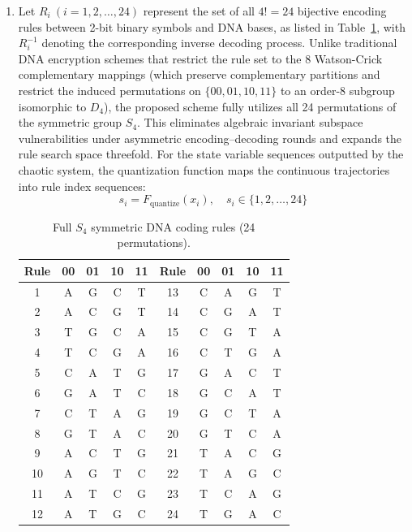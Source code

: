 \documentclass[a4paper,fleqn]{cas-dc}
\theoremstyle{plain}
\theoremstyle{definition}
\begin{document}
\begin{enumerate}
\item 
Let $R_i \ (i=1,2,\dots,24)$ represent the set of all $4! = 24$ bijective encoding rules between 2-bit binary symbols and DNA bases, as listed in Table~\ref{tab:dna_rules}, with $R_i^{-1}$ denoting the corresponding inverse decoding process. Unlike traditional DNA encryption schemes that restrict the rule set to the 8 Watson-Crick complementary mappings (which preserve complementary partitions and restrict the induced permutations on $\{00, 01, 10, 11\}$ to an order-8 subgroup isomorphic to $D_4$), the proposed scheme fully utilizes all 24 permutations of the symmetric group $S_4$. This eliminates algebraic invariant subspace vulnerabilities under asymmetric encoding--decoding rounds and expands the rule search space threefold. For the state variable sequences outputted by the chaotic system, the quantization function maps the continuous trajectories into rule index sequences:
\begin{equation}
	s_i = F_{\text{quantize}}(x_i), \quad s_i \in \{1, 2, \dots, 24\}
\end{equation}

\begin{table}[pos=!t,width=\textwidth]
		\centering
		\caption{Full $S_4$ symmetric DNA coding rules (24 permutations).}
		\label{tab:dna_rules}
		\begin{tabular}{c|cccc||c|cccc}
				\hline
				Rule & 00 & 01 & 10 & 11 & Rule & 00 & 01 & 10 & 11 \\
				\hline
				 1 & A & G & C & T & 13 & C & A & G & T \\
				 2 & A & C & G & T & 14 & C & G & A & T \\
				 3 & T & G & C & A & 15 & C & G & T & A \\
				 4 & T & C & G & A & 16 & C & T & G & A \\
				 5 & C & A & T & G & 17 & G & A & C & T \\
				 6 & G & A & T & C & 18 & G & C & A & T \\
				 7 & C & T & A & G & 19 & G & C & T & A \\
				 8 & G & T & A & C & 20 & G & T & C & A \\
				 9 & A & C & T & G & 21 & T & A & C & G \\
				10 & A & G & T & C & 22 & T & A & G & C \\
				11 & A & T & C & G & 23 & T & C & A & G \\
				12 & A & T & G & C & 24 & T & G & A & C \\
				\hline
		\end{tabular}
\end{table}
	

\end{enumerate}
\end{document}
